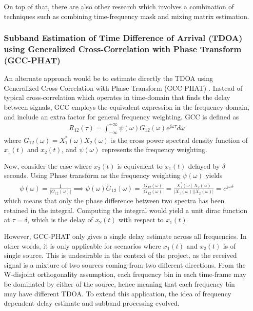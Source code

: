 \documentclass[a4paper,twoside,12pt,hidelinks]{article}
\begin{document}
On top of that, there are also other research which involves a combination of techniques such as combining time-frequency mask and mixing matrix estimation. 
\cite{Blin2005UnderdeterminedEstimation}
\subsubsection{Subband Estimation of Time Difference of Arrival (TDOA) using Generalized Cross-Correlation with Phase Transform (GCC-PHAT)}
An alternate approach would be to estimate directly the TDOA using Generalized Cross-Correlation with Phase Transform (GCC-PHAT) \cite{Knapp1976TheDelay}. Instead of typical cross-correlation which operates in time-domain that finds the delay between signals, GCC employs the equivalent expression in the frequency domain, and include an extra factor for general frequency weighting. GCC is defined as
\begin{align}
R_{12}(\tau) = \int^{+\infty}_{-\infty} \psi(\omega)G_{12}(\omega)e^{j\omega\tau} d\omega
\end{align}
where $G_{12}(\omega) = X_1^*(\omega)X_2(\omega)$ is the cross power spectral density function of $x_1(t)$ and $x_2(t)$, and $\psi(\omega)$ represents the frequency weighting. 

Now, consider the case where $x_2(t)$ is equivalent to $x_1(t)$ delayed by $\delta$ seconds. Using Phase transform as the frequency weighting $\psi(\omega)$ yields 
\begin{align}
\psi(\omega)=\frac{1}{|G_{12}(\omega)|} \implies \psi(\omega)G_{12}(\omega)=\frac{G_{12}(\omega)}{|G_{12}(\omega)|}=\frac{X_1^*(\omega)X_2(\omega)}{|X_1(\omega)||X_2(\omega)|}=e^{j\omega \delta}
\end{align}
which means that only the phase difference between two spectra has been retained in the integral. Computing the integral would yield a unit dirac function at $\tau =\delta$, which is the delay of $x_2(t)$ with respect to $x_1(t)$. 

However, GCC-PHAT only gives a single delay estimate across all frequencies. In other words, it is only applicable for scenarios where $x_1(t)$ and $x_2(t)$ is of single source. This is undesirable in the context of the project, as the received signal is a mixture of two sources coming from two different directions. From the W-disjoint orthogonality assumption, each frequency bin in each time-frame may be dominated by either of the source, hence meaning that each frequency bin may have different TDOA. To extend this application, the idea of frequency dependent delay estimate and subband processing evolved.
\end{document}
